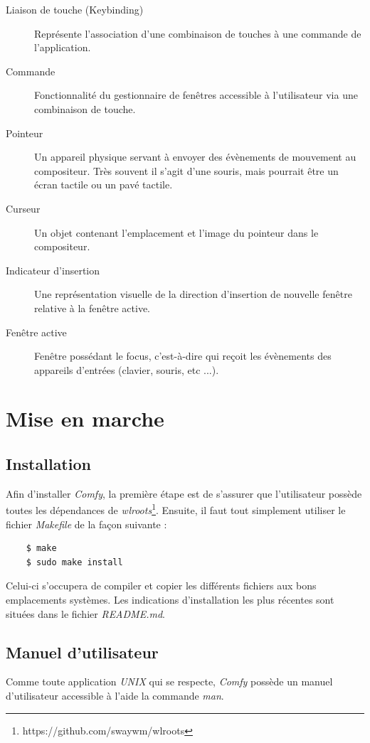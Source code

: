 \documentclass[titlepage]{article}
\begin{document}
\begin{description}
	\item [Liaison de touche (Keybinding)]
		Représente l'association d'une combinaison de touches à une commande de
		l'application.
	\item [Commande]
		Fonctionnalité du gestionnaire de fenêtres accessible à l'utilisateur via une
		combinaison de touche.
	\item [Pointeur]
		Un appareil physique servant à envoyer des évènements de mouvement au
		compositeur. Très souvent il s'agit d'une souris, mais pourrait être un
		écran tactile ou un pavé tactile.
	\item [Curseur]
		Un objet contenant l'emplacement et l'image du pointeur dans le compositeur.
	\item [Indicateur d'insertion]
		Une représentation visuelle de la direction d'insertion de nouvelle fenêtre
		relative à la fenêtre active.
	\item [Fenêtre active]
		Fenêtre possédant le focus, c'est-à-dire qui reçoit les évènements des
		appareils d'entrées (clavier, souris, etc ...).
\end{description}

\section{Mise en marche}
\subsection{Installation}
Afin d'installer \textit{Comfy}, la première étape est de s'assurer que
l'utilisateur possède toutes les dépendances de
\textit{wlroots}\footnote{https://github.com/swaywm/wlroots}. Ensuite, il faut
tout simplement utiliser le fichier \textit{Makefile} de la façon suivante :
\begin{verbatim}
	$ make
	$ sudo make install
\end{verbatim}

\par
Celui-ci s'occupera de compiler et copier les différents fichiers aux bons
emplacements systèmes. Les indications d'installation les plus récentes sont
situées dans le fichier \textit{README.md}.

\subsection{Manuel d'utilisateur}
Comme toute application \textit{UNIX} qui se respecte, \textit{Comfy} possède un
manuel d'utilisateur accessible à l'aide la commande \textit{man}.
\end{document}
